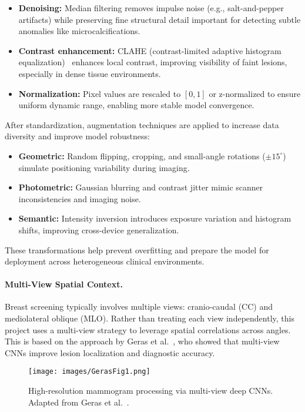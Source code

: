 \documentclass[12pt]{article}
\begin{document}
\begin{itemize}
    \item \textbf{Denoising:} Median filtering removes impulse noise (e.g., salt-and-pepper artifacts) while preserving fine structural detail important for detecting subtle anomalies like microcalcifications.
    \item \textbf{Contrast enhancement:} CLAHE (contrast-limited adaptive histogram equalization)~\cite{14} enhances local contrast, improving visibility of faint lesions, especially in dense tissue environments.
    \item \textbf{Normalization:} Pixel values are rescaled to $[0,1]$ or z-normalized to ensure uniform dynamic range, enabling more stable model convergence.
\end{itemize}

After standardization, augmentation techniques are applied to increase data diversity and improve model robustness:

\begin{itemize}
    \item \textbf{Geometric:} Random flipping, cropping, and small-angle rotations ($\pm15^{\circ}$) simulate positioning variability during imaging.
    \item \textbf{Photometric:} Gaussian blurring and contrast jitter mimic scanner inconsistencies and imaging noise.
    \item \textbf{Semantic:} Intensity inversion introduces exposure variation and histogram shifts, improving cross-device generalization.
\end{itemize}

These transformations help prevent overfitting and prepare the model for deployment across heterogeneous clinical environments.

\paragraph{Multi-View Spatial Context.}
Breast screening typically involves multiple views: cranio-caudal (CC) and mediolateral oblique (MLO). Rather than treating each view independently, this project uses a multi-view strategy to leverage spatial correlations across angles. This is based on the approach by Geras et al.~\cite{8}, who showed that multi-view CNNs improve lesion localization and diagnostic accuracy.

\begin{figure}[H]
    \centering
    \texttt{[image: images/GerasFig1.png]}
    \caption{High-resolution mammogram processing via multi-view deep CNNs. Adapted from Geras et al.~\cite{8}.}
    \label{fig:geras}
\end{figure}
\end{document}
